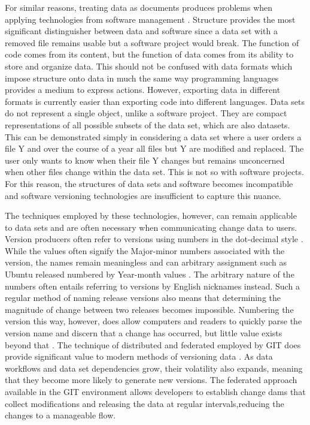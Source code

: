 For similar reasons, treating data as documents produces problems when applying technologies from software management \cite{tichy1985rcs}\cite{Chien:2000:VMX:646544.696357}.
Structure provides the most significant distinguisher between data and software since a data set with a removed file remains usable but a software project would break.
The function of code comes from its content, but the function of data comes from its ability to store and organize data.
This should not be confused with data formats which impose structure onto data in much the same way programming languages provides a medium to express actions.
However, exporting data in different formats is currently easier than exporting code into different languages.
Data sets do not represent a single object, unlike a software project\cite{Chacon:2009:PG:1618548}.
They are compact representations of all possible subsets of the data set, which are also datasets.
This can be demonstrated simply in considering a data set where a user orders a file Y and over the course of a year all files but Y are modified and replaced.
The user only wants to know when their file Y changes but remains unconcerned when other files change within the data set.
This is not so with software projects.
For this reason, the structures of data sets and software becomes incompatible and software versioning technologies are insufficient to capture this nuance.

The techniques employed by these technologies, however, can remain applicable to data sets and are often necessary when communicating change data to users.
Version producers often refer to versions using numbers in the dot-decimal style \cite{Stuckenholz:2005:CEV:1039174.1039197}.
While the values often signify the Major-minor numbers associated with the version, the names remain meaningless and can arbitrary assignment such as Ubuntu released numbered by Year-month values \cite{Ubuntu}.
The arbitrary nature of the numbers often entails referring to versions by English nicknames instead.
Such a regular method of naming release versions also means that determining the magnitude of change between two releases becomes impossible.
Numbering the version this way, however, does allow computers and readers to quickly parse the version name and discern that a change has occurred, but little value exists beyond that \cite{Dijkstra1994}.
The technique of distributed and federated employed by GIT does provide significant value to modern methods of versioning data \cite{cederqvist2002version}.
As data workflows and data set dependencies grow, their volatility also expands, meaning that they become more likely to generate new versions.
The federated approach available in the GIT environment allows developers to establish change dams that collect modifications and releasing the data at regular intervals,reducing the changes to a manageable flow.

